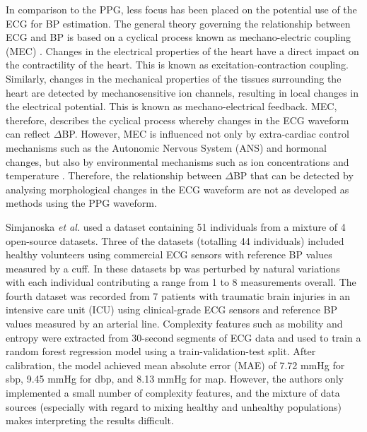 \documentclass[fleqn,10pt]{wlscirep}
\begin{document}
In comparison to the PPG, less focus has been placed on the potential use of the ECG for BP estimation. The general theory governing the relationship between ECG and BP is based on a cyclical process known as mechano-electric coupling (MEC) \cite{Timmermann2017}. Changes in the electrical properties of the heart have a direct impact on the contractility of the heart. This is known as excitation-contraction coupling. Similarly, changes in the mechanical properties of the tissues surrounding the heart are detected by mechanosensitive ion channels, resulting in local changes in the electrical potential. This is known as mechano-electrical feedback. MEC, therefore, describes the cyclical process whereby changes in the ECG waveform can reflect $\Delta$BP. However, MEC is influenced not only by extra-cardiac control mechanisms such as the Autonomic Nervous System (ANS) and hormonal changes, but also by environmental mechanisms such as ion concentrations and temperature \cite{Reed2014}. Therefore, the relationship between $\Delta$BP that can be detected by analysing morphological changes in the ECG waveform are not as developed as methods using the PPG waveform. %


Simjanoska \textit{et al.} \cite{Simjanoska2018} used a dataset containing 51 individuals from a mixture of 4 open-source datasets. Three of the datasets (totalling 44 individuals) included healthy volunteers using commercial ECG sensors with reference BP values measured by a cuff. In these datasets \ac{bp} was perturbed by natural variations with each individual contributing a range from 1 to 8 measurements overall. The fourth dataset was recorded from 7 patients with traumatic brain injuries in an intensive care unit (ICU) using clinical-grade ECG sensors and reference BP values measured by an arterial line. Complexity features such as mobility and entropy were extracted from 30-second segments of ECG data and used to train a random forest regression model using a train-validation-test split. After calibration, the model achieved mean absolute error (MAE) of 7.72 mmHg for \ac{sbp}, 9.45 mmHg for \ac{dbp}, and 8.13 mmHg for \ac{map}. However, the authors only implemented a small number of complexity features, and the mixture of data sources (especially with regard to mixing healthy and unhealthy populations) makes interpreting the results difficult. 
\end{document}
